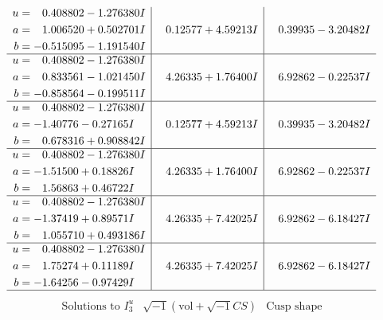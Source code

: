 \documentclass[1p]{elsarticle_modified}
\theoremstyle{definition}
\newcommand{\I}{\sqrt{-1}}
\begin{document}
$$\begin{array}{c|c|c}
\begin{aligned}
u &= \phantom{-}0.408802 - 1.276380 I \\
a &= \phantom{-}1.006520 + 0.502701 I \\
b &= -0.515095 - 1.191540 I\end{aligned}
 & \phantom{-}0.12577 + 4.59213 I & \phantom{-}0.39935 - 3.20482 I \\ \hline\begin{aligned}
u &= \phantom{-}0.408802 - 1.276380 I \\
a &= \phantom{-}0.833561 - 1.021450 I \\
b &= -0.858564 - 0.199511 I\end{aligned}
 & \phantom{-}4.26335 + 1.76400 I & \phantom{-}6.92862 - 0.22537 I \\ \hline\begin{aligned}
u &= \phantom{-}0.408802 - 1.276380 I \\
a &= -1.40776 - 0.27165 I \\
b &= \phantom{-}0.678316 + 0.908842 I\end{aligned}
 & \phantom{-}0.12577 + 4.59213 I & \phantom{-}0.39935 - 3.20482 I \\ \hline\begin{aligned}
u &= \phantom{-}0.408802 - 1.276380 I \\
a &= -1.51500 + 0.18826 I \\
b &= \phantom{-}1.56863 + 0.46722 I\end{aligned}
 & \phantom{-}4.26335 + 1.76400 I & \phantom{-}6.92862 - 0.22537 I \\ \hline\begin{aligned}
u &= \phantom{-}0.408802 - 1.276380 I \\
a &= -1.37419 + 0.89571 I \\
b &= \phantom{-}1.055710 + 0.493186 I\end{aligned}
 & \phantom{-}4.26335 + 7.42025 I & \phantom{-}6.92862 - 6.18427 I \\ \hline\begin{aligned}
u &= \phantom{-}0.408802 - 1.276380 I \\
a &= \phantom{-}1.75274 + 0.11189 I \\
b &= -1.64256 - 0.97429 I\end{aligned}
 & \phantom{-}4.26335 + 7.42025 I & \phantom{-}6.92862 - 6.18427 I\\
 \hline 
 \end{array}$$\newpage$$\begin{array}{c|c|c}  
\text{Solutions to }I^u_{3}& \I (\text{vol} + \sqrt{-1}CS) & \text{Cusp shape}\\

\end{array}$$
\end{document}

